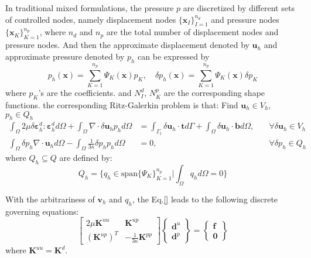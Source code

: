 In traditional mixed formulations, the pressure $p$ are discretized by different sets of controlled nodes, namely displacement nodes $\{\boldsymbol x_I\}_{I=1}^{n_d}$ and pressure nodes $\{\boldsymbol x_K\}_{K=1}^{n_p}$, where $n_d$ and $n_p$ are the total number of displacement nodes and pressure nodes. And then the approximate displacement denoted by $\boldsymbol u_h$ and approximate pressure denoted by $p_h$ can be expressed by  
\begin{equation}\label{p_h}
    p_h(\boldsymbol x) = \sum_{K=1}^{n_p} \Psi_K(\boldsymbol x) p_K, \quad
    \delta p_h(\boldsymbol x) = \sum_{K=1}^{n_p} \Psi_K(\boldsymbol x) \delta p_K
\end{equation}
where $p_K$'s are the coefficients. and $N_I^d$, $N_K^p$ are the corresponding shape functions.
the corresponding Ritz-Galerkin problem is that:
Find $\boldsymbol u_h \in V_h$, $p_h \in Q_h$
\begin{subequations}\label{ritz_mix}
\begin{alignat}{2}
\label{ritz_mix_1}
\int_\Omega 2\mu \delta \boldsymbol \varepsilon^d_h : \boldsymbol \varepsilon^d_h d\Omega +
\int_\Omega \nabla \cdot \delta \boldsymbol u_h p_h d\Omega &=
\int_{\Gamma_t} \delta \boldsymbol u_h \cdot \boldsymbol t d\Gamma + \int_\Omega \delta \boldsymbol u_h \cdot \boldsymbol b d\Omega, \quad
&\forall \delta \boldsymbol u_h \in V_h \\
\label{ritz_mix_2}
\int_\Omega \delta p_h \nabla \cdot \boldsymbol u_h d\Omega - \int_\Omega \frac{1}{3\kappa} \delta p_h p_h d\Omega &= 0, &\forall \delta p_h \in Q_h
\end{alignat}
\end{subequations}
where $Q_h \subseteq Q$ are defined by:
\begin{equation}
Q_h = \{q_h \in \mathrm{span}\{\Psi_K\}_{K=1}^{n_p} \vert \int_{\Omega} q_h d\Omega = 0\}
\end{equation}

With the arbitrariness of $\boldsymbol v_h$ and $q_h$, the Eq.\eqref{} leads to the following discrete governing equations:
\begin{equation}\label{equilibrium_mix}
    \begin{bmatrix}
        2\mu\boldsymbol K^{uu} & \boldsymbol K^{up} \\ (\boldsymbol K^{up})^T & -\frac{1}{3\kappa}\boldsymbol K^{pp}
    \end{bmatrix}
    \begin{Bmatrix}
        \boldsymbol d^u \\ \boldsymbol d^p 
    \end{Bmatrix} =
    \begin{Bmatrix}
        \boldsymbol f \\ \boldsymbol 0 
    \end{Bmatrix}
\end{equation}
where $\boldsymbol K^{uu} = \boldsymbol K^d$. 

